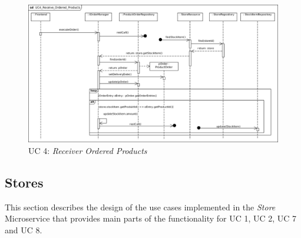 			\begin{figure}[!h]
				\centering
				\includegraphics[width = 1\textwidth]{img/UC4_Receive_Ordered_Products.jpg}
				\caption{UC 4: \textit{Receiver Ordered Products} }
				\label{MS_UC4}
			\end{figure}
			
		\FloatBarrier
			
		\subsection{Stores}
			This section describes the design of the use cases implemented in the \textit{Store} Microservice that provides main parts of the functionality for UC 1, UC 2, UC 7 and UC 8.\\
	
